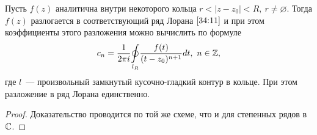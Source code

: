 \documentclass[../../main.tex]{subfiles}
\begin{document}
\begin{thm}
	Пусть $ f(z) $ аналитична внутри некоторого кольца $ r < |z - z_0| < R,\ r 
	\neq \varnothing $. Тогда $ f(z) $ разлогается в соответствующий ряд Лорана $ 
	\eqref{34:11} $ и при этом коэффициенты этого разложения можно вычислить по 
	формуле
	\begin{equation}\label{34:12}
		c_n = \frac{1}{2 \pi i} \underset{l_R}\oint\frac{f(t)}{(t - z_0)^{n + 1}} 
		dt,\ n \in \mathbb{Z},
	\end{equation}
	где $ l $~--- произвольный замкнутый кусочно-гладкий контур в кольце. При 
	этом разложение в ряд Лорана единственно.
\end{thm}

\begin{proof}
	Доказательство проводится по той же схеме, что и для степенных рядов в $\mathbb{C}$.
\end{proof}
\end{document}
